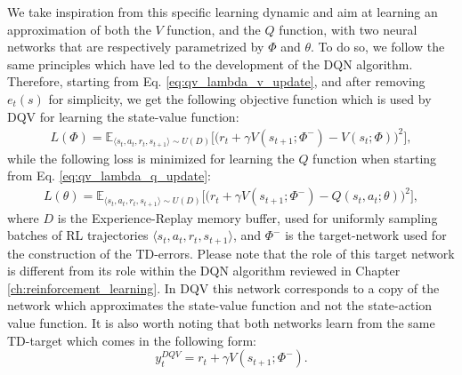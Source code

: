 We take inspiration from this specific learning dynamic and aim at learning an approximation of both the $V$ function, and the $Q$ function, with two neural networks that are respectively parametrized by $\Phi$ and $\theta$. To do so, we follow the same principles which have led to the development of the DQN algorithm. Therefore, starting from Eq. \ref{eq:qv_lambda_v_update}, and after removing $e_{t}(s)$ for simplicity, we get the following objective function which is used by DQV for learning the state-value function:
\begin{multline}
L(\Phi) = \mathds{E}_{\langle s_{t},a_{t},r_{t},s_{t+1}\rangle\sim U(D)} \bigg[\big(r_{t} + \gamma V(s_{t+1}; \Phi^{-}) - V(s_{t}; \Phi)\big)^{2}\bigg],
\label{eq:dqv_v_update}
\end{multline}
while the following loss is minimized for learning the $Q$ function when starting from Eq. \ref{eq:qv_lambda_q_update}:
\begin{multline}
    L(\theta) = \mathds{E}_{\langle s_{t},a_{t},r_{t},s_{t+1}\rangle\sim U(D)} \bigg[\big(r_{t} + \gamma V(s_{t+1}; \Phi^{-}) - Q(s_{t}, a_{t}; \theta)\big)^{2}\bigg],
\label{eq:dqv_q_update}
\end{multline}
where $D$ is the Experience-Replay memory buffer, used for uniformly sampling batches of RL trajectories $\langle s_{t},a_{t},r_{t},s_{t+1}\rangle$, and $\Phi^{-}$ is the target-network used for the construction of the TD-errors. Please note that the role of this target network is different from its role within the DQN algorithm reviewed in Chapter \ref{ch:reinforcement_learning}. In DQV this network corresponds to a copy of the network which approximates the state-value function and not the state-action value function. It is also worth noting that both networks learn from the same TD-target which comes in the following form:
\begin{equation}
y_{t}^{DQV} = r_{t} + \gamma V(s_{t+1}; \Phi^{-}). 
\end{equation}

